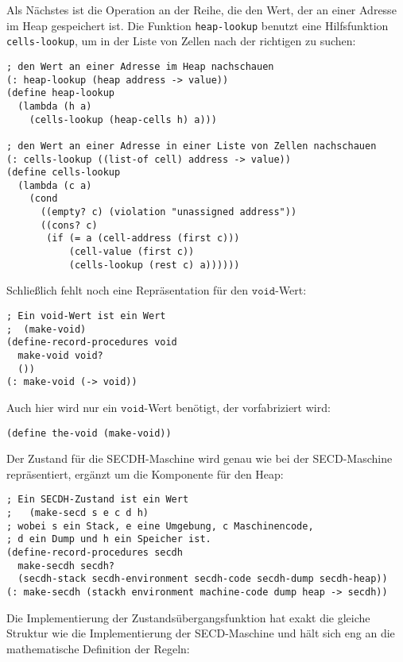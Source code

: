 %
Als Nächstes ist die Operation an der Reihe, die den Wert, der an einer
Adresse im Heap gespeichert ist.  Die Funktion \texttt{heap-lookup} benutzt
eine Hilfsfunktion \texttt{cells-lookup}, um in der Liste von Zellen
nach der richtigen zu suchen:
%
\begin{verbatim}
; den Wert an einer Adresse im Heap nachschauen
(: heap-lookup (heap address -> value))
(define heap-lookup
  (lambda (h a)
    (cells-lookup (heap-cells h) a)))

; den Wert an einer Adresse in einer Liste von Zellen nachschauen
(: cells-lookup ((list-of cell) address -> value))
(define cells-lookup
  (lambda (c a)
    (cond
      ((empty? c) (violation "unassigned address"))
      ((cons? c)
       (if (= a (cell-address (first c)))
           (cell-value (first c))
           (cells-lookup (rest c) a))))))
\end{verbatim}
%
Schließlich fehlt noch eine Repräsentation für den $\mathtt{void}$-Wert:
%
\begin{verbatim}
; Ein void-Wert ist ein Wert
;  (make-void)
(define-record-procedures void
  make-void void?
  ())
(: make-void (-> void))
\end{verbatim}
%
Auch hier wird nur ein $\mathtt{void}$-Wert benötigt, der 
vorfabriziert wird:
%
\begin{verbatim}
(define the-void (make-void))
\end{verbatim}
%
Der Zustand für die SECDH-Maschine wird genau wie bei der
SECD-Maschine repräsentiert, ergänzt um die Komponente für den Heap:
%
\begin{verbatim}
; Ein SECDH-Zustand ist ein Wert
;   (make-secd s e c d h)
; wobei s ein Stack, e eine Umgebung, c Maschinencode,
; d ein Dump und h ein Speicher ist.
(define-record-procedures secdh
  make-secdh secdh?
  (secdh-stack secdh-environment secdh-code secdh-dump secdh-heap))
(: make-secdh (stackh environment machine-code dump heap -> secdh))
\end{verbatim}
%
Die Implementierung der Zustandsübergangsfunktion hat exakt die
gleiche Struktur wie die Implementierung der SECD-Maschine und hält
sich eng an die mathematische Definition der Regeln:
%
